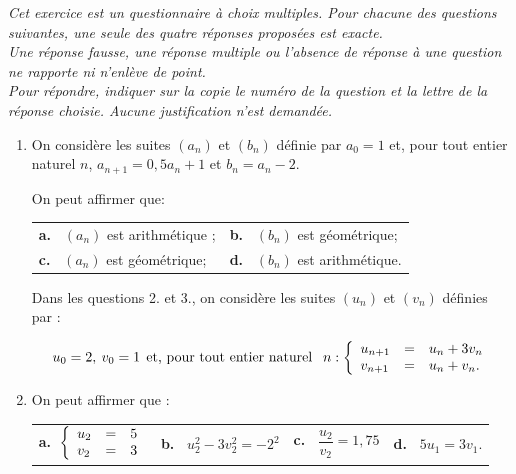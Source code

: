 \medskip

\emph{Cet exercice est un questionnaire à choix multiples. Pour chacune des questions suivantes, une seule des quatre réponses proposées est exacte.\\
Une réponse fausse, une réponse multiple ou l'absence de réponse à une question ne rapporte ni n'enlève de point.\\
Pour répondre, indiquer sur la copie le numéro de la question et la lettre de la réponse choisie. Aucune justification n'est demandée.}

\medskip

\begin{enumerate}
\item On considère les suites $\left(a_n\right)$ et $\left(b_n\right)$ définie par $a_0 = 1$ et, pour tout entier naturel $n$,\: $a_{n+1} = 0,5a_n + 1$ et $b_n = a_n - 2$.

On peut affirmer que:

\begin{center}
\begin{tabularx}{\linewidth}{*{2}{X}}
\textbf{a.~} $\left(a_n\right)$ est arithmétique ;&\textbf{b.~} $\left(b_n\right)$ est géométrique;\\
\textbf{c.~} $\left(a_n\right)$ est géométrique;&\textbf{d.~} $\left(b_n\right)$ est arithmétique.
\end{tabularx}
\end{center}

Dans les questions 2. et 3., on considère les suites $\left(u_n\right)$ et $\left(v_n\right)$ définies par :

\[u_0 = 2,\: v_0 = 1 \:\: \text{et, pour tout entier naturel }\:\:n : \left\{\begin{array}{l c l}
u_{n+1}&=&u_n + 3v_n\\
v_{n+1}&=&u_n + v_n.
\end{array}\right.\]

\item On peut affirmer que :

\begin{center}
\begin{tabularx}{\linewidth}{*{4}{X}}
\textbf{a.~}$\left\{\begin{array}{l c l}
u_2& =& 5\\ v_2 &=& 3
\end{array}\right.$&\textbf{b.~} $u_2^2 - 3v_2^2 = - 2^2$&\textbf{c.~} $\dfrac{u_2}{v_2} = 1,75$&\textbf{d.~} $5u_1 = 3v_1$.\\
\end{tabularx}
\end{center}


\end{enumerate}
